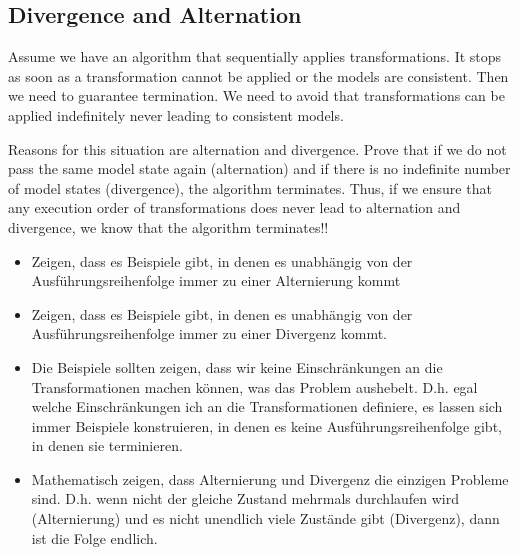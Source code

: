 

\subsection{Divergence and Alternation}

Assume we have an algorithm that sequentially applies transformations.
It stops as soon as a transformation cannot be applied or the models are consistent.
Then we need to guarantee termination.
We need to avoid that transformations can be applied indefinitely never leading to consistent models.

Reasons for this situation are alternation and divergence.
Prove that if we do not pass the same model state again (alternation) and if there is no indefinite number of model states (divergence), the algorithm terminates.
Thus, if we ensure that any execution order of transformations does never lead to alternation and divergence, we know that the algorithm terminates!!

\begin{itemize}
    \item Zeigen, dass es Beispiele gibt, in denen es unabhängig von der Ausführungsreihenfolge immer zu einer Alternierung kommt
    \item Zeigen, dass es Beispiele gibt, in denen es unabhängig von der Ausführungsreihenfolge immer zu einer Divergenz kommt.
    \item Die Beispiele sollten zeigen, dass wir keine Einschränkungen an die Transformationen machen können, was das Problem aushebelt. D.h. egal welche Einschränkungen ich an die Transformationen definiere, es lassen sich immer Beispiele konstruieren, in denen es keine Ausführungsreihenfolge gibt, in denen sie terminieren.
    \item Mathematisch zeigen, dass Alternierung und Divergenz die einzigen Probleme sind. D.h. wenn nicht der gleiche Zustand mehrmals durchlaufen wird (Alternierung) und es nicht unendlich viele Zustände gibt (Divergenz), dann ist die Folge endlich.
\end{itemize}

